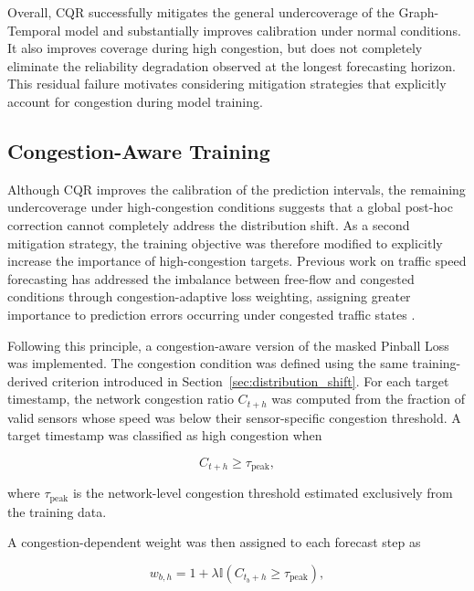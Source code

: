 Overall, CQR successfully mitigates the general undercoverage of the
Graph-Temporal model and substantially improves calibration under normal
conditions. It also improves coverage during high congestion, but does not
completely eliminate the reliability degradation observed at the longest
forecasting horizon. This residual failure motivates considering mitigation
strategies that explicitly account for congestion during model training.


\subsection{Congestion-Aware Training}
\label{subsec:congestion_aware}

Although CQR improves the calibration of the prediction intervals, the
remaining undercoverage under high-congestion conditions suggests that a
global post-hoc correction cannot completely address the distribution shift.
As a second mitigation strategy, the training objective was therefore
modified to explicitly increase the importance of high-congestion targets.
Previous work on traffic speed forecasting has addressed the imbalance
between free-flow and congested conditions through congestion-adaptive loss
weighting, assigning greater importance to prediction errors occurring under
congested traffic states \citep{zhang2025casaformer}.

Following this principle, a congestion-aware version of the masked Pinball
Loss was implemented. The congestion condition was defined using the same
training-derived criterion introduced in
Section~\ref{sec:distribution_shift}. For each target timestamp, the network
congestion ratio $C_{t+h}$ was computed from the fraction of valid sensors
whose speed was below their sensor-specific congestion threshold. A target
timestamp was classified as high congestion when

\begin{equation}
    C_{t+h} \geq \tau_{\mathrm{peak}},
\end{equation}

where $\tau_{\mathrm{peak}}$ is the network-level congestion threshold
estimated exclusively from the training data.

A congestion-dependent weight was then assigned to each forecast step as

\begin{equation}
    w_{b,h}
    =
    1
    +
    \lambda
    \mathbb{I}
    \left(
        C_{t_b+h} \geq \tau_{\mathrm{peak}}
    \right),
    \label{eq:congestion_weight}
\end{equation}

